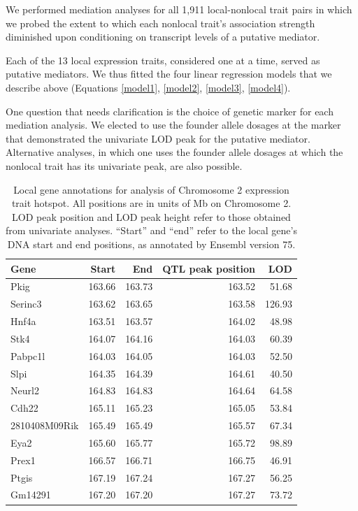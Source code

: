 \documentclass[oneside]{book}\usepackage[]{graphicx}\usepackage[]{color}
\begin{document}
We performed mediation analyses for 
all 1,911 local-nonlocal trait pairs in which
we probed the extent to which each nonlocal trait's association 
strength diminished upon conditioning on transcript levels of a putative mediator.

Each of the 13 local expression traits, considered one at a time, served as putative mediators. 
We thus fitted the four linear regression models that we describe
above (Equations \ref{model1}, \ref{model2}, \ref{model3}, \ref{model4}).

One question that needs clarification is the choice of genetic marker 
for each mediation analysis. 
We elected to use the founder allele dosages at the marker that demonstrated the 
univariate LOD peak for the putative mediator. 
Alternative analyses, in which one uses the founder allele dosages at which the 
nonlocal trait has its univariate peak, are also possible.




\begin{table}[ht]
\centering
\begin{tabular}{lrrrr}
  \hline
Gene & Start & End & QTL peak position & LOD\\
  \hline
Pkig & 163.66 & 163.73 & 163.52 & 51.68 \\
  Serinc3 & 163.62 & 163.65 & 163.58 & 126.93 \\
  Hnf4a & 163.51 & 163.57 & 164.02 & 48.98 \\
  Stk4 & 164.07 & 164.16 & 164.03 & 60.39 \\
  Pabpc1l & 164.03 & 164.05 & 164.03 & 52.50 \\
  Slpi & 164.35 & 164.39 & 164.61 & 40.50 \\
  Neurl2 & 164.83 & 164.83 & 164.64 & 64.58 \\
  Cdh22 & 165.11 & 165.23 & 165.05 & 53.84 \\
  2810408M09Rik & 165.49 & 165.49 & 165.57 & 67.34 \\
  Eya2 & 165.60 & 165.77 & 165.72 & 98.89 \\
  Prex1 & 166.57 & 166.71 & 166.75 & 46.91 \\
  Ptgis & 167.19 & 167.24 & 167.27 & 56.25 \\
  Gm14291 & 167.20 & 167.20 & 167.27 & 73.72 \\
   \hline
\end{tabular}
\caption{Local gene annotations for analysis of Chromosome 2 expression trait hotspot. 
All positions are in units of Mb on Chromosome 2. 
LOD peak position and LOD peak height refer to those obtained from univariate analyses. 
``Start'' and ``end'' refer to the local gene's DNA start and end positions, as annotated by Ensembl version 75.}
\label{tab:annot}
\end{table}
\end{document}
